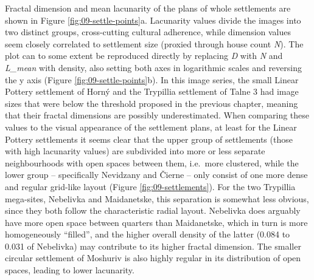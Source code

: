 \documentclass[
  12pt,
]{book}
\begin{document}
Fractal dimension and mean lacunarity of the plans of whole settlements are shown in Figure \ref{fig:09-settle-points}a. Lacunarity values divide the images into two distinct groups, cross-cutting cultural adherence, while dimension values seem closely correlated to settlement size (proxied through house count \emph{N}). The plot can to some extent be reproduced directly by replacing \emph{D} with \emph{N} and \emph{L\_mean} with density, also setting both axes in logarithmic scales and reversing the y axis (Figure \ref{fig:09-settle-points}b). In this image series, the small Linear Pottery settlement of Horný and the Trypillia settlement of Talne 3 had image sizes that were below the threshold proposed in the previous chapter, meaning that their fractal dimensions are possibly underestimated. When comparing these values to the visual appearance of the settlement plans, at least for the Linear Pottery settlements it seems clear that the upper group of settlements (those with high lacunarity values) are subdivided into more or less separate neighbourhoods with open spaces between them, i.e.~more clustered, while the lower group -- specifically Nevidzany and Čierne -- only consist of one more dense and regular grid-like layout (Figure \ref{fig:09-settlements}). For the two Trypillia mega-sites, Nebelivka and Maidanetske, this separation is somewhat less obvious, since they both follow the characteristic radial layout. Nebelivka does arguably have more open space between quarters than Maidanetske, which in turn is more homogeneously ``filled'', and the higher overall density of the latter (0.084 to 0.031 of Nebelivka) may contribute to its higher fractal dimension. The smaller circular settlement of Moshuriv is also highly regular in its distribution of open spaces, leading to lower lacunarity.
\end{document}
